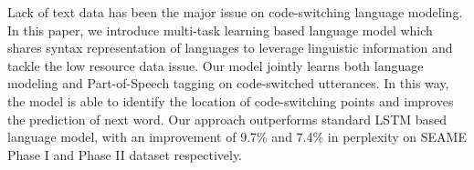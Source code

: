 Lack of text data has been the major issue on code-switching language modeling. In this paper, we introduce multi-task learning based language model which shares syntax representation of languages to leverage linguistic information and tackle the low resource data issue. Our model jointly learns both language modeling and Part-of-Speech tagging on code-switched utterances. In this way, the model is able to identify the location of code-switching points and improves the prediction of next word. Our approach outperforms standard LSTM based language model, with an improvement of 9.7\% and 7.4\% in perplexity on SEAME Phase I and Phase II dataset respectively.

